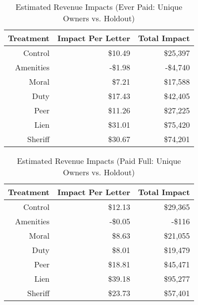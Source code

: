 \documentclass[12pt,titlepage]{article}
\begin{document}
\newpage

\begin{table}[ht]
\centering
\caption{Estimated Revenue Impacts (Ever Paid: Unique Owners vs. Holdout)} 
\label{rev_ep}
\begin{tabular}{rrr}
  \hline
Treatment & Impact Per Letter & Total Impact \\ 
  \hline
Control & \$10.49 & \$25,397 \\ 
  Amenities & -\$1.98 & -\$4,740 \\ 
  Moral & \$7.21 & \$17,588 \\ 
  Duty & \$17.43 & \$42,405 \\ 
  Peer & \$11.26 & \$27,225 \\ 
  Lien & \$31.01 & \$75,420 \\ 
  Sheriff & \$30.67 & \$74,201 \\ 
   \hline
\end{tabular}
\end{table}

\begin{table}[ht]
\centering
\caption{Estimated Revenue Impacts (Paid Full: Unique Owners vs. Holdout)} 
\label{rev_pf}
\begin{tabular}{rrr}
  \hline
Treatment & Impact Per Letter & Total Impact \\ 
  \hline
Control & \$12.13 & \$29,365 \\ 
  Amenities & -\$0.05 & -\$116 \\ 
  Moral & \$8.63 & \$21,055 \\ 
  Duty & \$8.01 & \$19,479 \\ 
  Peer & \$18.81 & \$45,471 \\ 
  Lien & \$39.18 & \$95,277 \\ 
  Sheriff & \$23.73 & \$57,401 \\ 
   \hline
\end{tabular}
\end{table}




\end{document}
